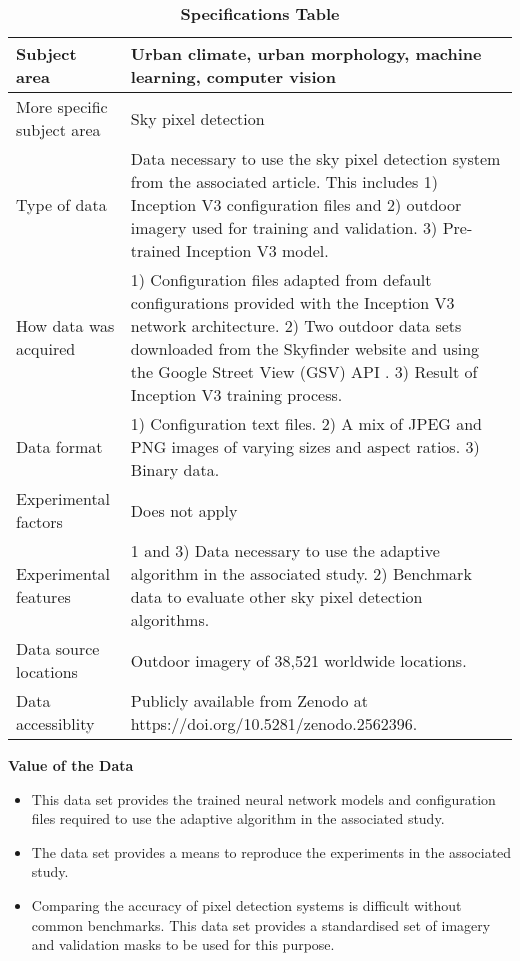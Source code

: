 \documentclass[final,3p,times,authoryear]{elsarticle}
\begin{document}
\begin{table}[!htbp]
\caption{\bf Specifications Table \label{tab:spectable}}  
\begin{tabular}{|p{4cm}|p{12cm}|}   
 \hline    
Subject area & Urban climate, urban morphology, machine learning, computer vision \\ \hline
More specific subject area & Sky pixel detection \\ \hline
Type of data & Data necessary to use the sky pixel detection system from the associated article. This includes 1) Inception V3 configuration files \citep{Szegedy2015a} and 2) outdoor imagery used for training and validation. 3) Pre-trained Inception V3 model. \\ \hline
How data was acquired & 1) Configuration files adapted from default configurations provided with the Inception V3 network architecture. 2) Two outdoor data sets downloaded from the Skyfinder website \citep{Mihail2015} and using the Google Street View (GSV) API \citep{GoogleMaps2017b}. 3) Result of Inception V3 training process.  \\ \hline
Data format & 1) Configuration text files. 2) A mix of JPEG and PNG images of varying sizes and aspect ratios. 3) Binary data.  \\ \hline
Experimental factors & Does not apply  \\ \hline
Experimental features & 1 and 3) Data necessary to use the adaptive algorithm in the associated study. 2) Benchmark data to evaluate other sky pixel detection algorithms.   \\ \hline
Data source locations & Outdoor imagery of 38,521 worldwide locations.   \\ \hline
Data accessiblity & Publicly available from Zenodo at https://doi.org/10.5281/zenodo.2562396.    \\ \hline
\end{tabular}
\end{table}

\textbf{Value of the Data}
\begin{itemize}
\item This data set provides the trained neural network models and configuration files required to use the adaptive algorithm in the associated study.
\item The data set provides a means to reproduce the experiments in the associated study.
\item Comparing the accuracy of pixel detection systems is difficult without common benchmarks. This data set provides a standardised set of imagery and validation masks to be used for this purpose.
\end{itemize}
\end{document}
